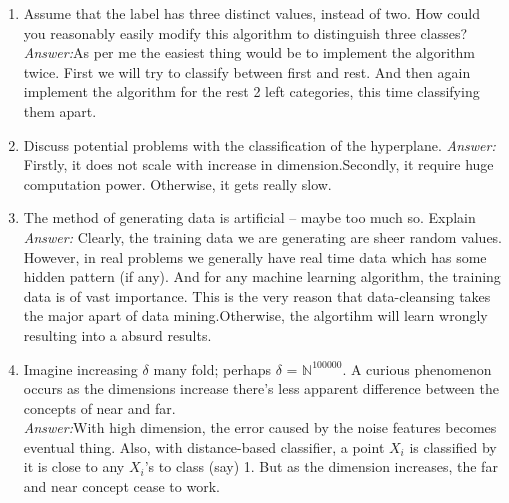 \documentclass{article}
\begin{document}
\begin{enumerate}
\begin{enumerate}
			\item Assume that the label has three distinct values, instead of two. How could you reasonably easily
			modify this algorithm to distinguish three classes? \\
			\emph{Answer:}As per me the easiest thing would be to implement the algorithm twice. First we will try to classify between first and rest. And then again implement the algorithm for the rest 2 left categories, this time classifying them apart.

			\item Discuss potential problems with the classification of the hyperplane.
			\emph{Answer:} Firstly, it does not scale with increase in dimension.Secondly, it require huge computation power. Otherwise, it gets really slow.

			\item The method of generating data is artificial – maybe too much so. Explain \\
			\emph{Answer:} Clearly, the training data we are generating are sheer random values. However, in real problems we generally have real time data which has some hidden pattern (if any). And for any machine learning algorithm, the training data is of vast importance. This is the very reason that data-cleansing takes the major apart of data mining.Otherwise, the algortihm will learn wrongly resulting into a absurd results.

			\item Imagine increasing  $\delta$ many fold; perhaps $\delta$ = $\mathbb{N}^{100000}$. A curious phenomenon occurs as the dimensions increase there's less apparent difference between the concepts of near and far. \\
			\emph{Answer:}With high dimension, the error caused by the noise features becomes eventual thing. Also, with distance-based classifier, a point $X_{i}$ is classified by it is close to any $X_{i}$'s to class (say) 1. But as the dimension increases, the far and near concept cease to work.
		\end{enumerate}
\end{enumerate}
\end{document}
